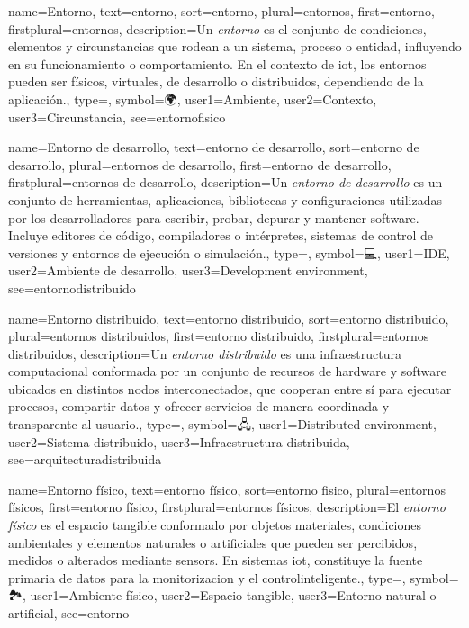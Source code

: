 	{
		name={Entorno},
		text={entorno},
		sort={entorno},
		plural={entornos},
		first={entorno},
		firstplural={entornos},
		description={Un \emph{entorno} es el conjunto de condiciones, elementos y circunstancias que rodean a un \gls{sistema}, proceso o entidad, influyendo en su funcionamiento o comportamiento. En el contexto de \gls{iot}, los entornos pueden ser f{\'i}sicos, virtuales, de desarrollo o distribuidos, dependiendo de la aplicaci{\'o}n.},
		type=\glsdefaulttype,
		symbol={🌍},
		user1={Ambiente},
		user2={Contexto},
		user3={Circunstancia},
		see={entornofisico}
	}
	
	{
		name={Entorno de desarrollo},
		text={entorno de desarrollo},
		sort={entorno de desarrollo},
		plural={entornos de desarrollo},
		first={entorno de desarrollo},
		firstplural={entornos de desarrollo},
		description={Un \emph{entorno de desarrollo} es un conjunto de herramientas, aplicaciones, bibliotecas y configuraciones utilizadas por los desarrolladores para escribir, probar, depurar y mantener software. Incluye editores de c{\'o}digo, compiladores o int{\'e}rpretes, sistemas de control de versiones y entornos de ejecuci{\'o}n o simulaci{\'o}n.},
		type=\glsdefaulttype,
		symbol={💻},
		user1={IDE},
		user2={Ambiente de desarrollo},
		user3={Development environment},
		see={entornodistribuido}
	}
	
	{
		name={Entorno distribuido},
		text={entorno distribuido},
		sort={entorno distribuido},
		plural={entornos distribuidos},
		first={entorno distribuido},
		firstplural={entornos distribuidos},
		description={Un \emph{entorno distribuido} es una infraestructura computacional conformada por un conjunto de recursos de \gls{hardware} y software ubicados en distintos nodos interconectados, que cooperan entre s{\'i} para ejecutar procesos, compartir \glspl{dato} y ofrecer servicios de manera coordinada y transparente al usuario.},
		type=\glsdefaulttype,
		symbol={🖧},
		user1={Distributed environment},
		user2={Sistema distribuido},
		user3={Infraestructura distribuida},
		see={arquitecturadistribuida}
	}
	
	{
		name={Entorno f{\'i}sico},
		text={entorno f{\'i}sico},
		sort={entorno fisico},
		plural={entornos f{\'i}sicos},
		first={entorno f{\'i}sico},
		firstplural={entornos f{\'i}sicos},
		description={El \emph{entorno f{\'i}sico} es el espacio tangible conformado por objetos materiales, condiciones ambientales y elementos naturales o artificiales que pueden ser percibidos, medidos o alterados mediante \glspl{sensor}. En sistemas \gls{iot}, constituye la fuente primaria de \glspl{dato} para la \gls{monitorizacion} y el \gls{controlinteligente}.},
		type=\glsdefaulttype,
		symbol={🏞️},
		user1={Ambiente f{\'i}sico},
		user2={Espacio tangible},
		user3={Entorno natural o artificial},
		see={entorno}
	}
	
